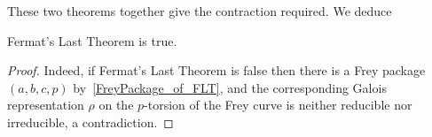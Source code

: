 These two theorems together give the contraction required. We deduce

\begin{corollary}\label{FLT}\leanok Fermat's Last Theorem is true.\end{corollary}
\begin{proof}\leanok
Indeed, if Fermat's Last Theorem is false then there is a Frey package $(a,b,c,p)$ by~\ref{FreyPackage_of_FLT}, and the corresponding Galois representation $\rho$ on the $p$-torsion of the Frey curve is neither reducible nor irreducible, a contradiction.
\end{proof}
